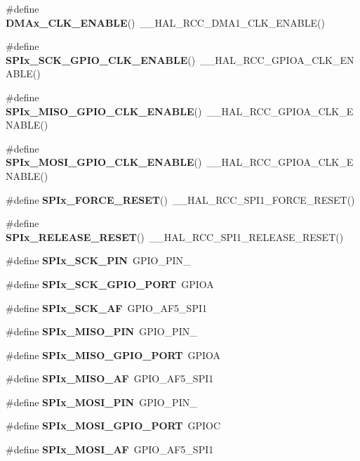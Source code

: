 \begin{DoxyCompactItemize}
\#define \textbf{ D\+M\+Ax\+\_\+\+C\+L\+K\+\_\+\+E\+N\+A\+B\+LE}()~\+\_\+\+\_\+\+H\+A\+L\+\_\+\+R\+C\+C\+\_\+\+D\+M\+A1\+\_\+\+C\+L\+K\+\_\+\+E\+N\+A\+B\+LE()
\item 
\#define \textbf{ S\+P\+Ix\+\_\+\+S\+C\+K\+\_\+\+G\+P\+I\+O\+\_\+\+C\+L\+K\+\_\+\+E\+N\+A\+B\+LE}()~\+\_\+\+\_\+\+H\+A\+L\+\_\+\+R\+C\+C\+\_\+\+G\+P\+I\+O\+A\+\_\+\+C\+L\+K\+\_\+\+E\+N\+A\+B\+LE()
\item 
\#define \textbf{ S\+P\+Ix\+\_\+\+M\+I\+S\+O\+\_\+\+G\+P\+I\+O\+\_\+\+C\+L\+K\+\_\+\+E\+N\+A\+B\+LE}()~\+\_\+\+\_\+\+H\+A\+L\+\_\+\+R\+C\+C\+\_\+\+G\+P\+I\+O\+A\+\_\+\+C\+L\+K\+\_\+\+E\+N\+A\+B\+LE()
\item 
\#define \textbf{ S\+P\+Ix\+\_\+\+M\+O\+S\+I\+\_\+\+G\+P\+I\+O\+\_\+\+C\+L\+K\+\_\+\+E\+N\+A\+B\+LE}()~\+\_\+\+\_\+\+H\+A\+L\+\_\+\+R\+C\+C\+\_\+\+G\+P\+I\+O\+A\+\_\+\+C\+L\+K\+\_\+\+E\+N\+A\+B\+LE()
\item 
\#define \textbf{ S\+P\+Ix\+\_\+\+F\+O\+R\+C\+E\+\_\+\+R\+E\+S\+ET}()~\+\_\+\+\_\+\+H\+A\+L\+\_\+\+R\+C\+C\+\_\+\+S\+P\+I1\+\_\+\+F\+O\+R\+C\+E\+\_\+\+R\+E\+S\+ET()
\item 
\#define \textbf{ S\+P\+Ix\+\_\+\+R\+E\+L\+E\+A\+S\+E\+\_\+\+R\+E\+S\+ET}()~\+\_\+\+\_\+\+H\+A\+L\+\_\+\+R\+C\+C\+\_\+\+S\+P\+I1\+\_\+\+R\+E\+L\+E\+A\+S\+E\+\_\+\+R\+E\+S\+ET()
\item 
\#define \textbf{ S\+P\+Ix\+\_\+\+S\+C\+K\+\_\+\+P\+IN}~G\+P\+I\+O\+\_\+\+P\+I\+N\+\_
\item 
\#define \textbf{ S\+P\+Ix\+\_\+\+S\+C\+K\+\_\+\+G\+P\+I\+O\+\_\+\+P\+O\+RT}~G\+P\+I\+OA
\item 
\#define \textbf{ S\+P\+Ix\+\_\+\+S\+C\+K\+\_\+\+AF}~G\+P\+I\+O\+\_\+\+A\+F5\+\_\+\+S\+P\+I1
\item 
\#define \textbf{ S\+P\+Ix\+\_\+\+M\+I\+S\+O\+\_\+\+P\+IN}~G\+P\+I\+O\+\_\+\+P\+I\+N\+\_
\item 
\#define \textbf{ S\+P\+Ix\+\_\+\+M\+I\+S\+O\+\_\+\+G\+P\+I\+O\+\_\+\+P\+O\+RT}~G\+P\+I\+OA
\item 
\#define \textbf{ S\+P\+Ix\+\_\+\+M\+I\+S\+O\+\_\+\+AF}~G\+P\+I\+O\+\_\+\+A\+F5\+\_\+\+S\+P\+I1
\item 
\#define \textbf{ S\+P\+Ix\+\_\+\+M\+O\+S\+I\+\_\+\+P\+IN}~G\+P\+I\+O\+\_\+\+P\+I\+N\+\_
\item 
\#define \textbf{ S\+P\+Ix\+\_\+\+M\+O\+S\+I\+\_\+\+G\+P\+I\+O\+\_\+\+P\+O\+RT}~G\+P\+I\+OC
\item 
\#define \textbf{ S\+P\+Ix\+\_\+\+M\+O\+S\+I\+\_\+\+AF}~G\+P\+I\+O\+\_\+\+A\+F5\+\_\+\+S\+P\+I1
\item 

\end{DoxyCompactItemize}

